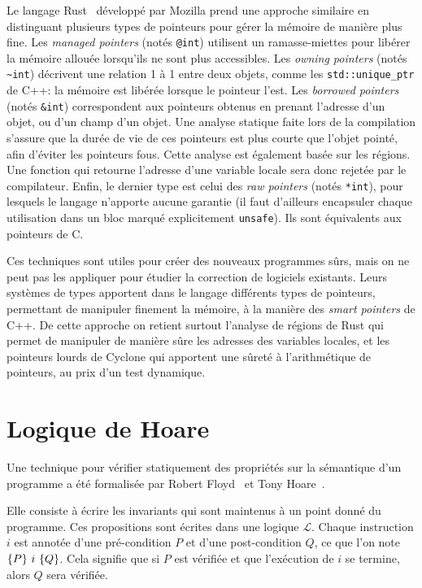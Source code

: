 Le langage Rust~ développé par Mozilla prend une approche similaire
en distinguant plusieurs types de pointeurs pour gérer la mémoire de manière
plus fine. Les \emph{managed pointers} (notés \texttt{@int}) utilisent un
ramasse-miettes pour libérer la mémoire allouée lorsqu'ils ne sont plus
accessibles. Les \emph{owning pointers} (notés \texttt{\textasciitilde{}int})
décrivent une relation 1 à 1 entre deux objets, comme les
\texttt{std::unique\_ptr} de C++: la mémoire est libérée lorsque le pointeur
l'est. Les \emph{borrowed pointers} (notés \texttt{\&int}) correspondent aux
pointeurs obtenus en prenant l'adresse d'un objet, ou d'un champ d'un objet. Une
analyse statique faite lors de la compilation s'assure que la durée de vie de
ces pointeurs est plus courte que l'objet pointé, afin d'éviter les pointeurs
fous. Cette analyse est également basée sur les régions. Une fonction qui
retourne l'adresse d'une variable locale sera donc rejetée par le compilateur.
Enfin, le dernier type est celui des \emph{raw pointers} (notés \texttt{*int}),
pour lesquels le langage n'apporte aucune garantie (il faut d'ailleurs
encapsuler chaque utilisation dans un bloc marqué explicitement
\texttt{unsafe}). Ils sont équivalents aux pointeurs de C.

Ces techniques sont utiles pour créer des nouveaux programmes sûrs, mais on ne
peut pas les appliquer pour étudier la correction de logiciels existants. Leurs
systèmes de types apportent dans le langage différents types de pointeurs,
permettant de manipuler finement la mémoire, à la manière des \emph{smart
pointers} de C++. De cette approche on retient surtout l'analyse de régions de
Rust qui permet de manipuler de manière sûre les adresses des variables locales,
et les pointeurs lourds de Cyclone qui apportent une sûreté à l'arithmétique de
pointeurs, au prix d'un test dynamique.

\section{Logique de Hoare}

Une technique pour vérifier statiquement des propriétés sur la sémantique d'un
programme a été formalisée par Robert Floyd~\cite{FloydMeaning} et Tony
Hoare~\cite{hoare}.

Elle consiste à écrire les invariants qui sont maintenus à un point donné du
programme. Ces propositions sont écrites dans une logique $\mathcal{L}$. Chaque
instruction $i$ est annotée d'une pré-condition $P$ et d'une post-condition $Q$,
ce que l'on note $\{P\}~i~\{Q\}$. Cela signifie que si $P$ est vérifiée et que
l'exécution de $i$ se termine, alors $Q$ sera vérifiée.

